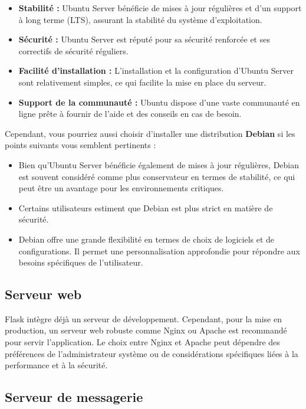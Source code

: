 \begin{itemize}
	\item \textbf{Stabilité :} Ubuntu Server bénéficie de mises à jour régulières et d'un support à long terme (LTS), assurant la stabilité du système d'exploitation.
	\item \textbf{Sécurité :} Ubuntu Server est réputé pour sa sécurité renforcée et ses correctifs de sécurité réguliers.
	\item \textbf{Facilité d'installation :} L'installation et la configuration d'Ubuntu Server sont relativement simples, ce qui facilite la mise en place du serveur.
	\item \textbf{Support de la communauté :} Ubuntu dispose d'une vaste communauté en ligne prête à fournir de l'aide et des conseils en cas de besoin.\\
\end{itemize}

Cependant, vous pourriez aussi choisir d'installer une distribution \textbf{Debian} si les points suivants vous semblent pertinents :
\begin{itemize}
	\item Bien qu'Ubuntu Server bénéficie également de mises à jour régulières, Debian est souvent considéré comme plus conservateur en termes de stabilité, ce qui peut être un avantage pour les environnements critiques.
	\item Certains utilisateurs estiment que Debian est plus strict en matière de sécurité.
	\item Debian offre une grande flexibilité en termes de choix de logiciels et de configurations. Il permet une personnalisation approfondie pour répondre aux besoins spécifiques de l'utilisateur.
\end{itemize}


\subsection{Serveur web}

Flask intègre déjà un serveur de développement. Cependant, pour la mise en production, un serveur web robuste comme Nginx ou Apache est recommandé pour servir l'application. Le choix entre Nginx et Apache peut dépendre des préférences de l'administrateur système ou de considérations spécifiques liées à la performance et à la sécurité.

\subsection{Serveur de messagerie}

